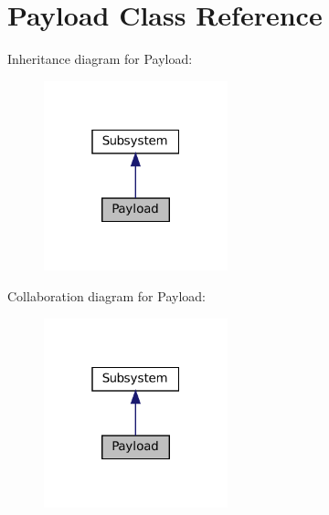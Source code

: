 \hypertarget{class_payload}{}\section{Payload Class Reference}
\label{class_payload}


Inheritance diagram for Payload\+:\nopagebreak
\begin{figure}[H]
\begin{center}
\leavevmode
\includegraphics[width=151pt]{class_payload__inherit__graph}
\end{center}
\end{figure}


Collaboration diagram for Payload\+:\nopagebreak
\begin{figure}[H]
\begin{center}
\leavevmode
\includegraphics[width=151pt]{class_payload__coll__graph}
\end{center}
\end{figure}
